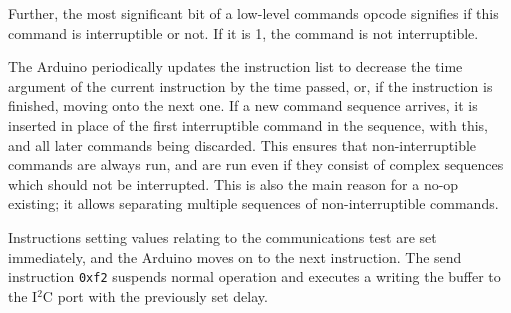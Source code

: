 Further, the most significant bit of a low-level commands opcode signifies if this command is interruptible or not. If it is 1, the command is not interruptible.

The Arduino periodically updates the instruction list to decrease the time argument of the current instruction by the time passed, or, if the instruction is finished, moving onto the next one. If a new command sequence arrives, it is inserted in place of the first interruptible command in the sequence, with this, and all later commands being discarded. This ensures that non-interruptible commands are always run, and are run even if they consist of complex sequences which should not be interrupted. This is also the main reason for a no-op existing; it allows separating multiple sequences of non-interruptible commands.

Instructions setting values relating to the communications test are set immediately, and the Arduino moves on to the next instruction. The send instruction \texttt{0xf2} suspends normal operation and executes a writing the buffer to the I$^2$C port with the previously set delay.